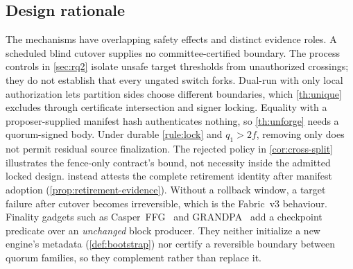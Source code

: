\subsection{Design rationale}
The mechanisms have overlapping safety effects and distinct evidence roles. A scheduled blind
cutover supplies no committee-certified boundary. The process controls in \cref{sec:rq2} isolate
unsafe target thresholds from unauthorized crossings; they do not establish that every ungated
switch forks. Dual-run with only local authorization lets
partition sides choose different boundaries, which \cref{th:unique} excludes through certificate
intersection and signer locking. Equality with a proposer-supplied manifest hash authenticates
nothing, so \cref{th:unforge} needs a quorum-signed body. Under durable \cref{rule:lock} and
$q_1>2f$, removing only \FenceCert{} does not permit residual source finalization. The rejected
policy in \cref{cor:cross-split} illustrates the fence-only contract's bound, not necessity inside
the admitted locked design. \FenceCert{} instead attests the complete retirement identity after
manifest adoption (\cref{prop:retirement-evidence}). Without a rollback window, a
target failure after cutover becomes irreversible, which is the Fabric~v3 behaviour. Finality gadgets
such as Casper~FFG~\cite{casperffg} and GRANDPA~\cite{grandpa} add a checkpoint predicate over an
\emph{unchanged} block producer. They neither initialize a new engine's metadata
(\cref{def:bootstrap}) nor certify a reversible boundary between quorum families, so they complement
\sage{} rather than replace it.
